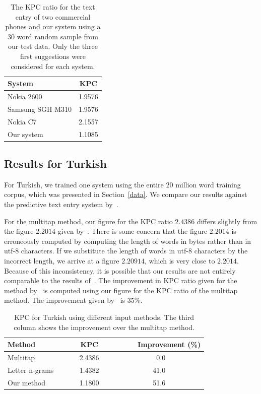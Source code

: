 \documentclass{llncs}
\begin{document}
\begin{table}
\caption{The KPC ratio for the text entry of two commercial phones and
  our system using a $30$ word random sample from our test data. Only
  the three first suggestions were considered for each system.}\label{mobile-phone-kpc}
\begin{center}
\begin{tabular}{lc}
\hline
System & KPC\\
\hline
Nokia 2600       & 1.9576\\
Samsung SGH M310 & 1.9576\\
Nokia C7         & 2.1557\\
Our system       & 1.1085\\
\hline
\end{tabular}
\end{center}
\end{table}

\subsection{Results for Turkish}

For Turkish, we trained one system using the entire $20$ million word
training corpus, which was presented in Section~\ref{data}. We compare
our results against the predictive text entry system
by~\cite{Tantug:2010}.

For the multitap method, our figure for the KPC ratio $2.4386$ differs
slightly from the figure $2.2014$ given by~\cite{Tantug:2010}. There
is some concern that the figure $2.2014$ is erroneously computed by
computing the length of words in bytes rather than in utf-8
characters. If we substitute the length of words in utf-8 characters
by the incorrect length, we arrive at a figure $2.20914$, which is
very close to $2.2014$. Because of this inconsistency, it is possible
that our results are not entirely comparable to the results
of~\cite{Tantug:2010}. The improvement in KPC ratio given for the method
by~\cite{Tantug:2010} is computed using our figure for the KPC ratio
of the multitap method. The improvement given by~\cite{Tantug:2010} is
$35\%$.

\begin{table}
\caption{KPC for Turkish using different input methods. The third
  column shows the improvement over the multitap method.}\label{Turkish-kpc-table}
\begin{center}
\begin{tabular}{lcr}
\hline
Method~~~~& ~~~~KPC~~~~ & ~~~~Improvement (\%)\\
\hline
Multitap                          &  2.4386 &0.0~~~~~~~~~~\\
Letter n-grams~\cite{Tantug:2010} &  1.4382 &41.0~~~~~~~~~~\\
Our method                        &  1.1800 &51.6~~~~~~~~~~\\
\hline
\end{tabular}
\end{center}
\end{table}
\end{document}
